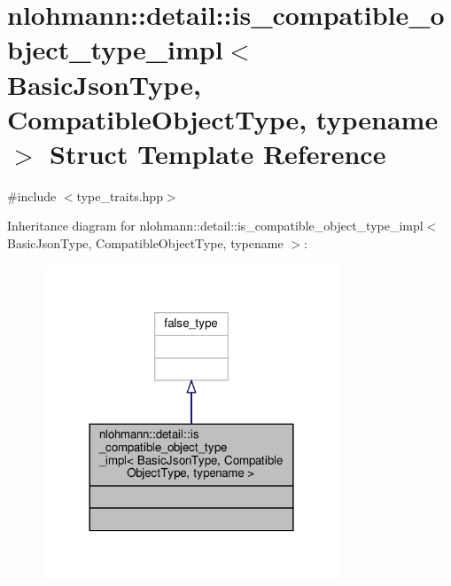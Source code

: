 \hypertarget{structnlohmann_1_1detail_1_1is__compatible__object__type__impl}{}\section{nlohmann\+:\+:detail\+:\+:is\+\_\+compatible\+\_\+object\+\_\+type\+\_\+impl$<$ Basic\+Json\+Type, Compatible\+Object\+Type, typename $>$ Struct Template Reference}
\label{structnlohmann_1_1detail_1_1is__compatible__object__type__impl}


{\ttfamily \#include $<$type\+\_\+traits.\+hpp$>$}



Inheritance diagram for nlohmann\+:\+:detail\+:\+:is\+\_\+compatible\+\_\+object\+\_\+type\+\_\+impl$<$ Basic\+Json\+Type, Compatible\+Object\+Type, typename $>$\+:\nopagebreak
\begin{figure}[H]
\begin{center}
\leavevmode
\includegraphics[width=252pt]{structnlohmann_1_1detail_1_1is__compatible__object__type__impl__inherit__graph}
\end{center}
\end{figure}



